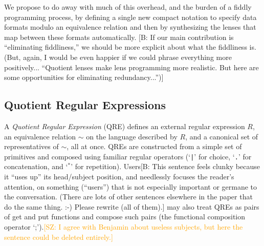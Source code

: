 \documentclass[acmsmall,review,anonymous]{acmart}
\newcommand{\FINISH}[3]{\ifdraft\textcolor{#1}{[#2: #3]}\fi}
\newcommand{\bcp}[1]{\FINISH{dkred}{B}{#1}}
\newcommand{\saz}[1]{\FINISH{orange}{SZ}{#1}}
\newcommand{\bibtex}{\textsc{Bib}\TeX{}}
\newcommand{\cd}[1]{\lstinline[backgroundcolor=\color{white}]$#1$}
\begin{document}

We propose to do away with much of this overhead, and the burden of a
fiddly programming process, by defining a single new compact notation
to specify data formats modulo an equivalence relation and then by
synthesizing the lenses that map between these formats automatically.
\bcp{If our main contribution is ``eliminating fiddliness,'' we should be
  more explicit about what the fiddliness is.  (But, again, I would be even
  happier if we could phrase everything more positively... ``Quotient lenses
  make lens programming more realistic.  But here are some opportunities for
  eliminating redundancy...'')}

\subsection{Quotient Regular Expressions}
\label{subsec:qre-expressions}

A {\em Quotient Regular Expression} (QRE) defines an external regular
expression $R$, an equivalence relation $\sim$ on the language described by
$R$, and a canonical set of representatives of $\sim$, all at once.  QREs
are constructed from a simple set of primitives and composed using familiar
regular operators (`\cd{|}' for choice, `\cd{.}' for concatenation, and
`$^*$' for repetition).  Users\bcp{This sentence feels clunky because it
  ``uses up'' its head/subject position, and needlessly focuses the reader's
  attention, on something (``users'') that is not especially important or
  germane to the conversation.  (There are lots of other sentences elsewhere
  in the paper that do the same thing. :-) Please rewrite (all of them).}
may also treat QREs as pairs of get and put functions and compose such pairs
(the functional composition operator `;').\saz{I agree with Benjamin about
  useless subjects, but here the sentence could be deleted entirely.}
\end{document}
